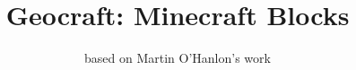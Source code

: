 \documentclass[twocolumn]{geocraft-worksheet-multipage}
\begin{document}
\title{Geocraft: Minecraft Blocks}
\subtitle{based on Martin O'Hanlon's work}
\date{}

\twocolumn[
 \begin{@twocolumnfalse}
   \maketitle
 \end{@twocolumnfalse}
]
\begin{center}



    \tabletail{\hline}

    \tablelasttail{\hline}



\end{center}
\end{document}
